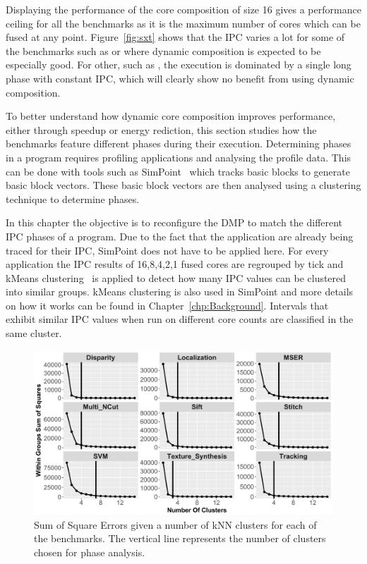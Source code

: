 Displaying the performance of the core composition of size 16 gives a performance ceiling for all the benchmarks as it is the maximum number of cores which can be fused at any point.
Figure~\ref{fig:sxt} shows that the IPC varies a lot for some of the benchmarks such as  or  where dynamic composition is expected to be especially good.
For other, such as , the execution is dominated by a single long phase with constant IPC, which will clearly show no benefit from using dynamic composition.

To better understand how dynamic core composition improves performance, either through speedup or energy rediction, this section studies how the benchmarks feature different phases during their execution.
Determining phases in a program requires profiling applications and analysing the profile data.
This can be done with tools such as SimPoint~\cite{simpoint} which tracks basic blocks to generate basic block vectors.
These basic block vectors are then analysed using a clustering technique to determine phases.

In this chapter the objective is to reconfigure the DMP to match the different IPC phases of a program.
Due to the fact that the application are already being traced for their IPC, SimPoint does not have to be applied here.
For every application the IPC results of 16,8,4,2,1 fused cores are regrouped by tick and kMeans clustering~\cite{kanungoKMeans02} is applied to detect how many IPC values can be clustered into similar groups.
kMeans clustering is also used in SimPoint and more details on how it works can be found in Chapter~\ref{chp:Background}.
Intervals that exhibit similar IPC values when run on different core counts are classified in the same cluster.

\begin{figure}[t]
    \centering
    \includegraphics[width=1\textwidth]{cases-paper/graphics/Exploration/SSE_final.pdf}
    \caption{Sum of Square Errors given a number of kNN clusters for each of the benchmarks. The vertical line represents the number of clusters chosen for phase analysis.}
    \label{fig:sse}
		\vspace{1em}
\end{figure}

